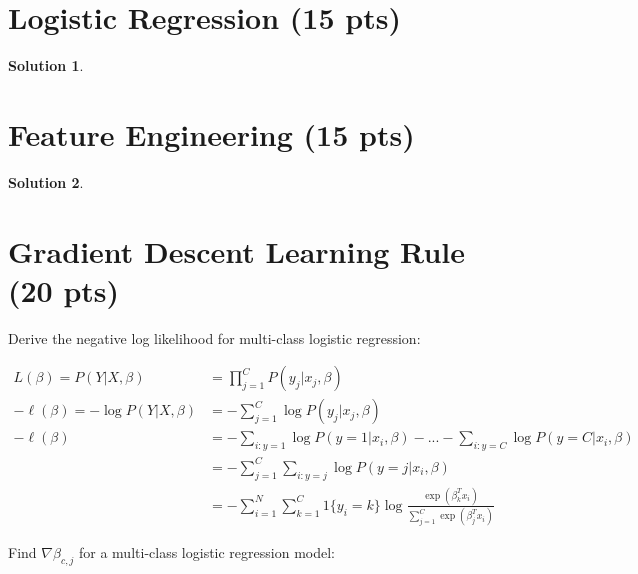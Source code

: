 \documentclass[11pt]{article}
\newtheorem*{solution*}{Solution}
\begin{document}
\thispagestyle{empty}

\newlength{\boxlength}\setlength{\boxlength}{\textwidth}
\addtolength{\boxlength}{-4mm}

\begin{center}
\end{center}




\section{Logistic Regression (15 pts)}

\begin{solution*}
\end{solution*}


\section{Feature Engineering (15 pts)}

\begin{solution*}
\end{solution*}

\section{Gradient Descent Learning Rule (20 pts)}

Derive the negative log likelihood for multi-class logistic regression:

\begin{align*}
	L (\beta) = P(Y \vert X, \beta) &= \prod_{j = 1}^{C} P(y_{j} \vert x_{j}, \beta)\\
	-\ell(\beta) = -\log P(Y \vert X, \beta) &= -\sum_{j = 1}^{C} \log P(y_{j} \vert x_{j}, \beta)\\
	-\ell(\beta) &= -\sum_{i:y=1}\log P(y = 1 \vert x_{i}, \beta) - ... - \sum_{i:y=C}\log P(y = C \vert x_{i}, \beta)\\
	&= -\sum_{j = 1}^{C} \sum_{i:y=j} \log P(y = j \vert x_{i}, \beta)\\
	&= -\sum_{i = 1}^{N} \sum_{k=1}^{C} 1\{y_{i} = k\} \log \frac{\exp(\beta_{k}^{T}x_{i})}{\sum_{j=1}^{C}\exp(\beta_{j}^{T}x_{i})}
\end{align*}

Find $\nabla \beta_{c,j}$ for a multi-class logistic regression model: 
\end{document}
